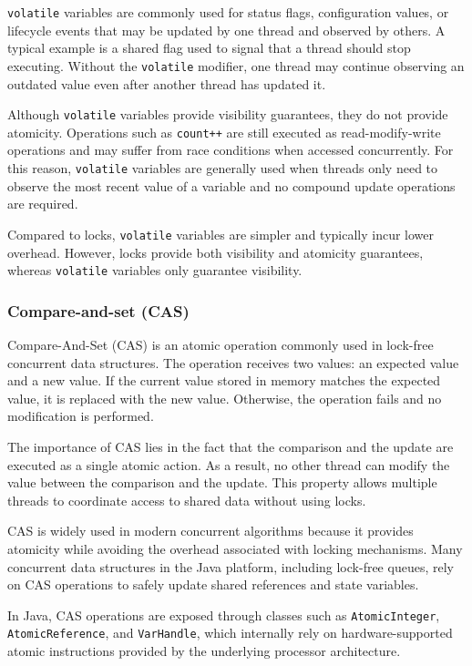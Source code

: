 \texttt{volatile} variables are commonly used for status flags, configuration values, or lifecycle events that may be updated by one thread and observed by others. A typical example is a shared flag used to signal that a thread should stop executing. Without the \texttt{volatile} modifier, one thread may continue observing an outdated value even after another thread has updated it. \cite{java-concurrency}

Although \texttt{volatile} variables provide visibility guarantees, they do not provide atomicity. Operations such as \texttt{count++} are still executed as read-modify-write operations and may suffer from race conditions when accessed concurrently. For this reason, \texttt{volatile} variables are generally used when threads only need to observe the most recent value of a variable and no compound update operations are required. \cite{java-concurrency}

Compared to locks, \texttt{volatile} variables are simpler and typically incur lower overhead. However, locks provide both visibility and atomicity guarantees, whereas \texttt{volatile} variables only guarantee visibility. \cite{java-concurrency}

\subsubsection{Compare-and-set (CAS)}
Compare-And-Set (CAS) is an atomic operation commonly used in lock-free concurrent data structures. The operation receives two values: an expected value and a new value. If the current value stored in memory matches the expected value, it is replaced with the new value. Otherwise, the operation fails and no modification is performed. \cite{art-multiprocessor}

The importance of CAS lies in the fact that the comparison and the update are executed as a single atomic action. As a result, no other thread can modify the value between the comparison and the update. This property allows multiple threads to coordinate access to shared data without using locks. \cite{art-multiprocessor}

CAS is widely used in modern concurrent algorithms because it provides atomicity while avoiding the overhead associated with locking mechanisms. Many concurrent data structures in the Java platform, including lock-free queues, rely on CAS operations to safely update shared references and state variables. \cite{art-multiprocessor}

In Java, CAS operations are exposed through classes such as \texttt{AtomicInteger}, \texttt{AtomicReference}, and \texttt{VarHandle}, which internally rely on hardware-supported atomic instructions provided by the underlying processor architecture. \cite{art-multiprocessor}

